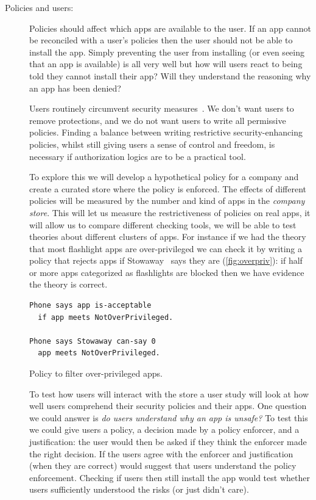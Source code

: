 \documentclass[a4paper,sfsidenotes]{%
  scrartcl%
}
\begin{document}
\begin{description}

  \item[Policies and users:] Policies should affect which apps are
    available to the user. If an app cannot be reconciled with a user's policies
    then the user should not be able to install the app.  Simply preventing the
    user from installing (or even seeing that an app is available) is all very
    well but how will users react to being told they cannot install their app?
    Will they understand the reasoning why an app has been denied?  
    
    Users routinely circumvent security measures~\cite{Blythe:2013dt}. We don't
    want users to remove protections, and we do not want users to write all
    permissive policies.  Finding a balance between writing restrictive
    security-enhancing policies, whilst still giving users a sense of control
    and freedom, is necessary if authorization logics are to be a practical
    tool.

    To explore this we will develop a hypothetical policy for a company and
    create a curated store where the policy is enforced.  The effects of
    different policies will be measured by the number and kind of apps in the
    \emph{company store}.  This will let us measure the restrictiveness of
    policies on real apps, it will allow us to compare different checking tools,
    we will be able to test theories about different clusters of apps.  For
    instance if we had the theory that most flashlight apps are over-privileged
    we can check it by writing a policy that rejects apps if
    Stowaway~\cite{Felt:2011kj} says they are (\autoref{fig:overpriv}): if
    half or more apps categorized as flashlights are blocked then we have
    evidence the theory is correct.

    \begin{marginfigure}
      \begin{lstlisting}[language=SecPAL]
Phone says app is-acceptable
  if app meets NotOverPrivileged.

Phone says Stowaway can-say 0
  app meets NotOverPrivileged.
      \end{lstlisting}
      \caption{Policy to filter over-privileged apps.}
      \label{fig:overpriv}
    \end{marginfigure}

    To test how users will interact with the store a user study will look at how
    well users comprehend their security policies and their apps.   One question
    we could answer is \emph{do users understand why an app is unsafe?}  To test
    this we could give users a policy, a decision made by a policy enforcer, and
    a justification:  the user would then be asked if they think the enforcer
    made the right decision.  If the users agree with the enforcer and
    justification (when they are correct) would suggest that users understand
    the policy enforcement.  Checking if users then still install the app would
    test whether users sufficiently understood the risks (or just didn't care).
    

\end{description}
\end{document}

